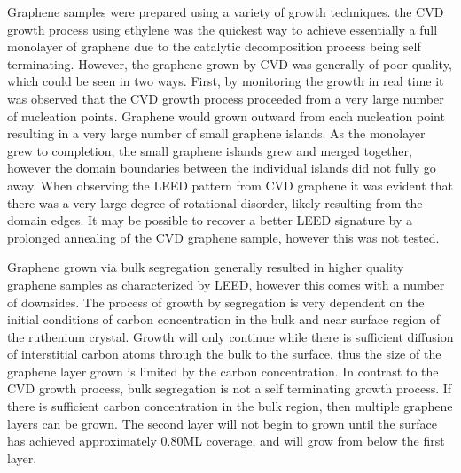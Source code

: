  Graphene samples were prepared using a variety of growth techniques. the CVD growth process using ethylene was the quickest way to achieve essentially a full monolayer of graphene due to the catalytic decomposition process being self terminating. However, the graphene grown by CVD was generally of poor quality, which could be seen in two ways. First, by monitoring the growth in real time it was observed that the CVD growth process proceeded from a very large number of nucleation points. Graphene would grown outward from each nucleation point resulting in a very large number of small graphene islands. As the monolayer grew to completion, the small graphene islands grew and merged together, however the domain boundaries between the individual islands did not fully go away. When observing the LEED pattern from CVD graphene it was evident that there was a very large degree of rotational disorder, likely resulting from the domain edges. It may be possible to recover a better LEED signature by a prolonged annealing of the CVD graphene sample, however this was not tested.

Graphene grown via bulk segregation generally resulted in higher quality graphene samples as characterized by LEED, however this comes with a number of downsides. The process of growth by segregation is very dependent on the initial conditions of carbon concentration in the bulk and near surface region of the ruthenium crystal. Growth will only continue while there is sufficient diffusion of interstitial carbon atoms through the bulk to the surface, thus the size of the graphene layer grown is limited by the carbon concentration. In contrast to the CVD growth process, bulk segregation is not a self terminating growth process. If there is sufficient carbon concentration in the bulk region, then multiple graphene layers can be grown. The second layer will not begin to grown until the surface has achieved approximately 0.80ML coverage, and will grow from below the first layer. \cite{sutterleem, Graphene-on-metals}

